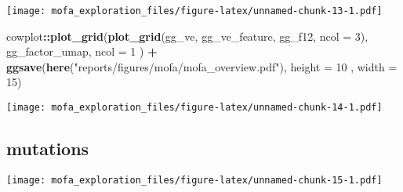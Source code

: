 \documentclass[
]{article}
\newenvironment{Shaded}{\begin{snugshade}}{\end{snugshade}}
\newcommand{\DataTypeTok}[1]{\textcolor[rgb]{0.13,0.29,0.53}{#1}}
\newcommand{\DecValTok}[1]{\textcolor[rgb]{0.00,0.00,0.81}{#1}}
\newcommand{\KeywordTok}[1]{\textcolor[rgb]{0.13,0.29,0.53}{\textbf{#1}}}
\newcommand{\NormalTok}[1]{#1}
\newcommand{\OperatorTok}[1]{\textcolor[rgb]{0.81,0.36,0.00}{\textbf{#1}}}
\newcommand{\StringTok}[1]{\textcolor[rgb]{0.31,0.60,0.02}{#1}}
\begin{document}
\texttt{[image: mofa\_exploration\_files/figure-latex/unnamed-chunk-13-1.pdf]}

\begin{Shaded}
\begin{Highlighting}[]
\NormalTok{cowplot}\OperatorTok{::}\KeywordTok{plot_grid}\NormalTok{(}\KeywordTok{plot_grid}\NormalTok{(gg_ve, gg_ve_feature, gg_f12, }\DataTypeTok{ncol =} \DecValTok{3}\NormalTok{),}
\NormalTok{                   gg_factor_umap,}
                   \DataTypeTok{ncol =} \DecValTok{1}
\NormalTok{                   ) }\OperatorTok{+}\StringTok{ }
\StringTok{  }\KeywordTok{ggsave}\NormalTok{(}\KeywordTok{here}\NormalTok{(}\StringTok{"reports/figures/mofa/mofa_overview.pdf"}\NormalTok{), }\DataTypeTok{height =} \DecValTok{10}\NormalTok{ , }\DataTypeTok{width =} \DecValTok{15}\NormalTok{)}
\end{Highlighting}
\end{Shaded}

\texttt{[image: mofa\_exploration\_files/figure-latex/unnamed-chunk-14-1.pdf]}

\hypertarget{mutations}{%
\subsection{mutations}\label{mutations}}

\begin{Shaded}
\end{Shaded}

\texttt{[image: mofa\_exploration\_files/figure-latex/unnamed-chunk-15-1.pdf]}

\begin{Shaded}
\end{Shaded}
\end{document}
